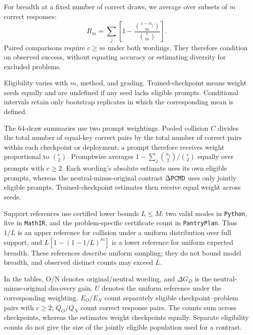 For breadth at a fixed number of correct draws, we average over subsets of $m$ correct responses:
\[
 R_m=\sum_j\left[1-\frac{\binom{c-n_j}{m}}{\binom{c}{m}}\right].
\]
Paired comparisons require $c\ge m$ under both wordings. They therefore condition on observed success, without equating accuracy or estimating diversity for excluded problems.

Eligibility varies with $m$, method, and grading. Trained-checkpoint means weight seeds equally and are undefined if any seed lacks eligible prompts. Conditional intervals retain only bootstrap replicates in which the corresponding mean is defined.

The 64-draw summaries use two prompt weightings. Pooled collision $C$ divides the total number of equal-key correct pairs by the total number of correct pairs within each checkpoint or deployment; a prompt therefore receives weight proportional to $\binom{c}{2}$. Promptwise \pmd{} averages $1-\sum_j\binom{n_j}{2}/\binom{c}{2}$ equally over prompts with $c\ge2$. Each wording's absolute estimate uses its own eligible prompts, whereas the neutral-minus-original contrast $\Delta\texttt{PCMD}$ uses only jointly eligible prompts. Trained-checkpoint estimates then receive equal weight across seeds.

Support references use certified lower bounds $L\le M$: two valid modes in \texttt{Python}, five in \texttt{MathIR}, and the problem-specific certificate count in \texttt{PantryPlan}. Thus $1/L$ is an upper reference for collision under a uniform distribution over full support, and $L[1-(1-1/L)^m]$ is a lower reference for uniform expected breadth. These references describe uniform sampling; they do not bound model breadth, and observed distinct counts may exceed $L$.

In the tables, O/N denotes original/neutral wording, and $\Delta G_D$ is the neutral-minus-original discovery gain. $U$ denotes the uniform reference under the corresponding weighting. $E_O/E_N$ count separately eligible checkpoint--problem pairs with $c\ge2$; $Q_O/Q_N$ count correct response pairs. The counts sum across checkpoints, whereas the estimates weight checkpoints equally. Separate eligibility counts do not give the size of the jointly eligible population used for a contrast.


